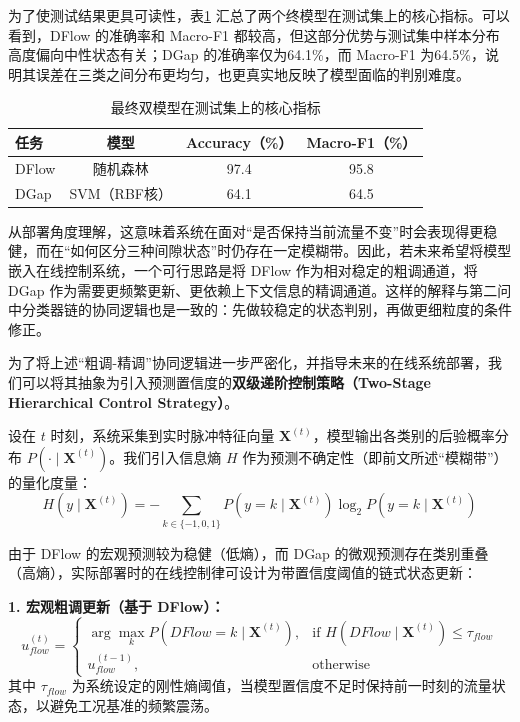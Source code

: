 \documentclass[UTF8,a4paper,12pt]{ctexart}
\begin{document}
为了使测试结果更具可读性，表\ref{tab:testbrief} 汇总了两个终模型在测试集上的核心指标。可以看到，DFlow 的准确率和 Macro-F1 都较高，但这部分优势与测试集中样本分布高度偏向中性状态有关；DGap 的准确率仅为64.1\%，而 Macro-F1 为64.5\%，说明其误差在三类之间分布更均匀，也更真实地反映了模型面临的判别难度。

\begin{table}[H]
\centering
\caption{最终双模型在测试集上的核心指标}
\label{tab:testbrief}
\begin{tabular}{lccc}
\toprule
任务 & 模型 & Accuracy（\%） & Macro-F1（\%） \\
\midrule
DFlow & 随机森林 & 97.4 & 95.8 \\
DGap & SVM（RBF核） & 64.1 & 64.5 \\
\bottomrule
\end{tabular}
\end{table}

从部署角度理解，这意味着系统在面对“是否保持当前流量不变”时会表现得更稳健，而在“如何区分三种间隙状态”时仍存在一定模糊带。因此，若未来希望将模型嵌入在线控制系统，一个可行思路是将 DFlow 作为相对稳定的粗调通道，将 DGap 作为需要更频繁更新、更依赖上下文信息的精调通道。这样的解释与第二问中分类器链的协同逻辑也是一致的：先做较稳定的状态判别，再做更细粒度的条件修正。

为了将上述“粗调-精调”协同逻辑进一步严密化，并指导未来的在线系统部署，我们可以将其抽象为引入预测置信度的\textbf{双级递阶控制策略（Two-Stage Hierarchical Control Strategy）}。

设在 $t$ 时刻，系统采集到实时脉冲特征向量 $\mathbf{X}^{(t)}$，模型输出各类别的后验概率分布 $P(\cdot \mid \mathbf{X}^{(t)})$。我们引入信息熵 $H$ 作为预测不确定性（即前文所述“模糊带”）的量化度量：
\begin{equation}
    H(y \mid \mathbf{X}^{(t)}) = - \sum_{k \in \{-1,0,1\}} P(y=k \mid \mathbf{X}^{(t)}) \log_2 P(y=k \mid \mathbf{X}^{(t)})
\end{equation}

由于 DFlow 的宏观预测较为稳健（低熵），而 DGap 的微观预测存在类别重叠（高熵），实际部署时的在线控制律可设计为带置信度阈值的链式状态更新：

\textbf{1. 宏观粗调更新（基于 DFlow）：}
\begin{equation}
    u_{flow}^{(t)} = 
    \begin{cases}
        \arg\max_k P(DFlow=k \mid \mathbf{X}^{(t)}), & \text{if } H(DFlow \mid \mathbf{X}^{(t)}) \leq \tau_{flow} \\
        u_{flow}^{(t-1)}, & \text{otherwise}
    \end{cases}
\end{equation}
其中 $\tau_{flow}$ 为系统设定的刚性熵阈值，当模型置信度不足时保持前一时刻的流量状态，以避免工况基准的频繁震荡。
\end{document}
